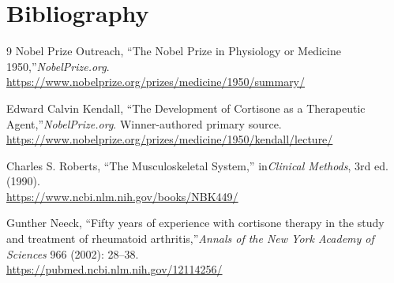\section{Bibliography}

\begin{thebibliography}{9}
Nobel Prize Outreach, ``The Nobel Prize in Physiology or Medicine 1950,''\emph{NobelPrize.org}.\\
\url{https://www.nobelprize.org/prizes/medicine/1950/summary/}

Edward Calvin Kendall, ``The Development of Cortisone as a Therapeutic Agent,''\emph{NobelPrize.org}. Winner-authored primary source.\\
\url{https://www.nobelprize.org/prizes/medicine/1950/kendall/lecture/}

Charles S. Roberts, ``The Musculoskeletal System,'' in\emph{Clinical Methods}, 3rd ed. (1990).\\
\url{https://www.ncbi.nlm.nih.gov/books/NBK449/}

Gunther Neeck, ``Fifty years of experience with cortisone therapy in the study and treatment of rheumatoid arthritis,''\emph{Annals of the New York Academy of Sciences} 966 (2002): 28--38.\\
\url{https://pubmed.ncbi.nlm.nih.gov/12114256/}
\end{thebibliography}
